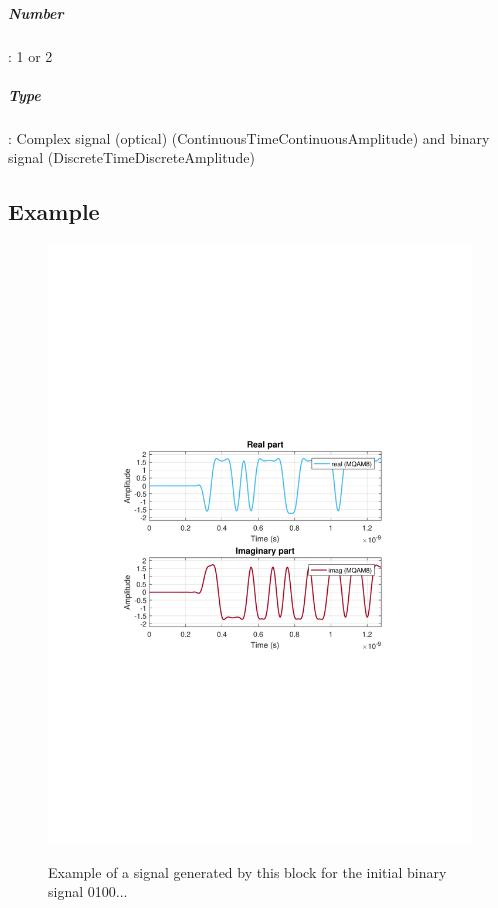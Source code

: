 \subparagraph*{Number}: 1 or 2

\subparagraph*{Type}: Complex signal (optical) (ContinuousTimeContinuousAmplitude) and binary signal (DiscreteTimeDiscreteAmplitude)

\subsection*{Example}
\begin{figure}[h]
	\centering
	\includegraphics[clip, trim=0.5cm 9cm 0.5cm 9cm, width=\textwidth]{./lib/iq_modulator/figures/MQAM_iq_modulator_output.pdf}
	\label{MQAM8_DeterministicAppendZeros}\caption{Example of a signal generated by this block for the initial binary signal 0100...}
\end{figure}

